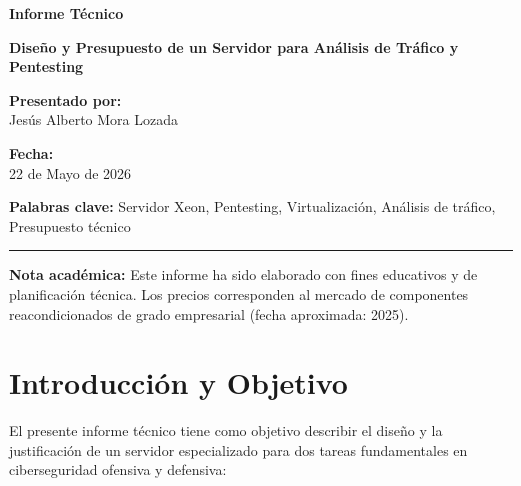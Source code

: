 \documentclass[12pt, letterpaper]{article}
\newcommand{\authorname}{Jesús Alberto Mora Lozada}
\begin{document}
\begin{titlepage}
    \centering
    \vspace*{1cm}
    
    \Huge
    \textbf{Informe Técnico}
    
    \vspace{0.5cm}
    \Large
    \textbf{Diseño y Presupuesto de un Servidor para Análisis de Tráfico y Pentesting}
    
    \vspace{1.5cm}
    \normalsize
    \textbf{Presentado por:} \\
    \vspace{0.3cm}
    \authorname
    
    \vspace{0.8cm}
    \textbf{Fecha:} \\
    \vspace{0.3cm}
    22 de Mayo de 2026
    
    \vspace{1.5cm}
    \textbf{Palabras clave:} Servidor Xeon, Pentesting, Virtualización, Análisis de tráfico, Presupuesto técnico
    
    \vfill
    \rule{0.8\textwidth}{0.4pt}
    \vspace{0.3cm}
    \small
    \textbf{Nota académica:} Este informe ha sido elaborado con fines educativos y de planificación técnica. Los precios corresponden al mercado de componentes reacondicionados de grado empresarial (fecha aproximada: 2025).
    
\end{titlepage}

\tableofcontents
\newpage

\section{Introducción y Objetivo}

El presente informe técnico tiene como objetivo describir el diseño y la justificación de un servidor especializado para dos tareas fundamentales en ciberseguridad ofensiva y defensiva:
\end{document}

